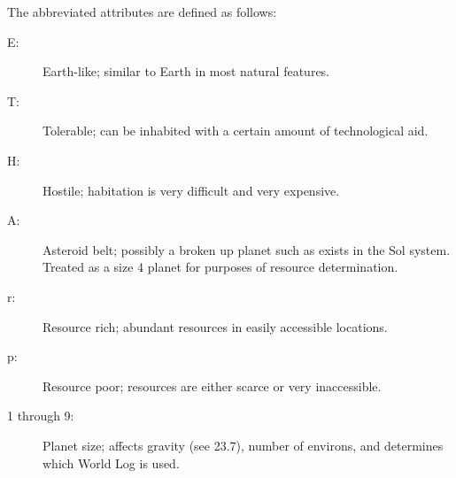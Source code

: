 The abbreviated attributes are defined as follows:

\begin{description}
\item[E:] Earth-like; similar to Earth in most natural features.
\item[T:] Tolerable; can be inhabited with a certain amount of
  technological aid.
\item[H:] Hostile; habitation is very difficult and very expensive.
\item[A:] Asteroid belt; possibly a broken up planet such as exists in
  the Sol system. Treated as a size 4 planet for purposes of resource
  determination.
\item[r:] Resource rich; abundant resources in easily accessible
  locations.
\item[p:] Resource poor; resources are either scarce or very
  inaccessible.
\item[1 through 9:] Planet size; affects gravity (see 23.7), number of
  environs, and determines which World Log is used.
\end{description}

